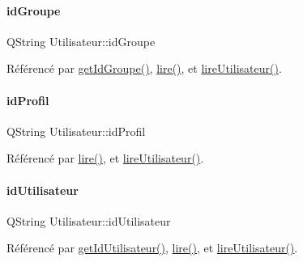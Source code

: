 \paragraph{\texorpdfstring{id\+Groupe}{idGroupe}}
{\footnotesize\ttfamily Q\+String Utilisateur\+::id\+Groupe\hspace{0.3cm}{\ttfamily [private]}}



Référencé par \hyperlink{class_utilisateur_a12d3730085761780dd54ffbcf4741721}{get\+Id\+Groupe()}, \hyperlink{class_utilisateur_aa7d1a92ff4e06e9d302369f6c48884e1}{lire()}, et \hyperlink{class_utilisateur_a5911f84daf6d47d7f50e6d16022b292e}{lire\+Utilisateur()}.

\mbox{\label{class_utilisateur_a042947e8b86637d1eb012c3fc89a959e}} 
\paragraph{\texorpdfstring{id\+Profil}{idProfil}}
{\footnotesize\ttfamily Q\+String Utilisateur\+::id\+Profil\hspace{0.3cm}{\ttfamily [private]}}



Référencé par \hyperlink{class_utilisateur_aa7d1a92ff4e06e9d302369f6c48884e1}{lire()}, et \hyperlink{class_utilisateur_a5911f84daf6d47d7f50e6d16022b292e}{lire\+Utilisateur()}.

\mbox{\label{class_utilisateur_ae1763e7a52c82c63506bc4160cdabb20}} 
\paragraph{\texorpdfstring{id\+Utilisateur}{idUtilisateur}}
{\footnotesize\ttfamily Q\+String Utilisateur\+::id\+Utilisateur\hspace{0.3cm}{\ttfamily [private]}}



Référencé par \hyperlink{class_utilisateur_aae4df3c09e4bd421407ea526876a2eaf}{get\+Id\+Utilisateur()}, \hyperlink{class_utilisateur_aa7d1a92ff4e06e9d302369f6c48884e1}{lire()}, et \hyperlink{class_utilisateur_a5911f84daf6d47d7f50e6d16022b292e}{lire\+Utilisateur()}.

